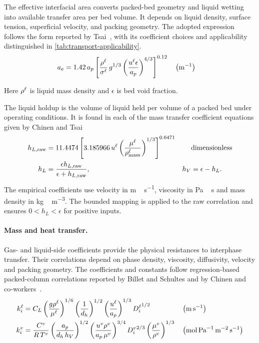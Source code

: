 The effective interfacial area converts packed-bed geometry and liquid wetting into available transfer area per bed volume.
It depends on liquid density, surface tension, superficial velocity, and packing geometry.
The adopted expression follows the form reported by Tsai~\cite{Tsai2010}, with its coefficient choices and applicability distinguished in \cref{tab:transport-applicability}.
\begin{align}
a_e
&= 1.42\,a_p\left[\frac{\rho^{\liq}}{\sigma^{\liq}}\,g^{1/3}\left(\frac{u^{\liq}\epsilon}{a_p}\right)^{4/3}\right]^{0.12} && \left(\unit{m^{-1}}\right)
\end{align}

Here \(\rho^{\ell}\) is liquid mass density and \(\epsilon\) is bed void fraction.


The liquid holdup is the volume of liquid held per volume of a packed bed under operating conditions.
It is found in each of the mass transfer coefficient equations given by Chinen and Tsai~\cite{Chinen2018,Tsai2010}
\begin{align}
h_{L,\mathrm{raw}} &= 11.4474\left[3.185966\,u^{\ell}\left(\frac{\mu^{\ell}}{\rho_{\mathrm{mass}}^{\ell}}\right)^{1/3}\right]^{0.6471}
&& \text{dimensionless}\\
h_L &= \frac{\epsilon h_{L,\mathrm{raw}}}{\epsilon+h_{L,\mathrm{raw}}},&
h_V &= \epsilon-h_L.
\end{align}
The empirical coefficients use velocity in \unit{m\,s^{-1}}, viscosity in \unit{Pa\,s} and mass density in \unit{kg\,m^{-3}}.
The bounded mapping is applied to the raw correlation and ensures \(0<h_L<\epsilon\) for positive inputs.

\paragraph{Mass and heat transfer.}
Gas- and liquid-side coefficients provide the physical resistances to interphase transfer.
Their correlations depend on phase density, viscosity, diffusivity, velocity and packing geometry.
The coefficients and constants follow regression-based packed-column correlations reported by Billet and Schultes and by Chinen and co-workers~\cite{Billet1999,Chinen2018}.
\begin{align}
k^{\liq}_i &= C_L
\left(\frac{g\rho^{\liq}}{\mu^{\liq}}\right)^{1/6}
\left(\frac{1}{d_h}\right)^{1/2}
\left(\frac{u^{\liq}}{a_p}\right)^{1/3}
{D_i^{\liq}}^{1/2}
&& \left(\unit{m\,s^{-1}}\right)\\
k^{\vap}_i &= \frac{C^{\vap}}{R\,T^{\vap}}
\left(\frac{a_p}{d_h\,h_V}\right)^{1/2}
\left(\frac{u^{\vap}\rho^{\vap}}{a_p\,\mu^{\vap}}\right)^{3 / 4}
{D_i^{\vap}}^{2 / 3}
\left(\frac{\mu^{\vap}}{\rho^{\vap}}\right)^{1 / 3}
&& \left(\unit{mol\,Pa^{-1}\,m^{-2}\,s^{-1}}\right)
\end{align}

